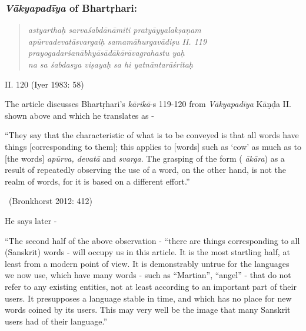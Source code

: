 \subsubsection*{\textit{Vākyapadīya} of Bhartṛhari:}

\begin{verse}
\textit{astyarthaḥ sarvaśabdānāmiti pratyāyyalakṣaṇam }\\\textit{apūrvadevatāsvargaiḥ samamāhurgavādiṣu  II. 119\\\textit{prayogadarśanābhyāsādākārāvagrahastu yaḥ }\\\textit{na sa śabdasya viṣayaḥ sa hi yatnāntarāśritaḥ }}
\end{verse}

\vspace{-.8cm}

\begin{flushright}
II. 120 (Iyer 1983: 58)
\end{flushright}


The article discusses Bhartṛhari’s \textit{kārikā}-s 119-120 from \textit{Vākyapadīya} Kāṇḍa II. shown above and which he translates as -

\begin{myquote}
“They say that the characteristic of what is to be conveyed is that all words have things [corresponding to them]; this applies to [words] such as ‘cow’ as much as to [the words] \textit{apūrva, devatā} and \textit{svarga}. The grasping of the form (\textit{ ākāra}) as a result of repeatedly observing the use of a word, on the other hand, is not the realm of words, for it is based on a different effort.” 
\end{myquote}

\vspace{-.3cm}

\begin{myquote}

~\hfill (Bronkhorst 2012: 412)
\end{myquote}

He says later -

\begin{myquote}
“The second half of the above observation - “there are things corresponding to all (Sanskrit) words - will occupy us in this article. It is the most startling half, at least from a modern point of view. It is demonstrably untrue for the languages we now use, which have many words - such as “Martian”, “angel” - that do not refer to any existing entities, not at least according to an important part of their users. It presupposes a language stable in time, and which has no place for new words coined by its users. This may very well be the image that many Sanskrit users had of their language.”
\end{myquote}

